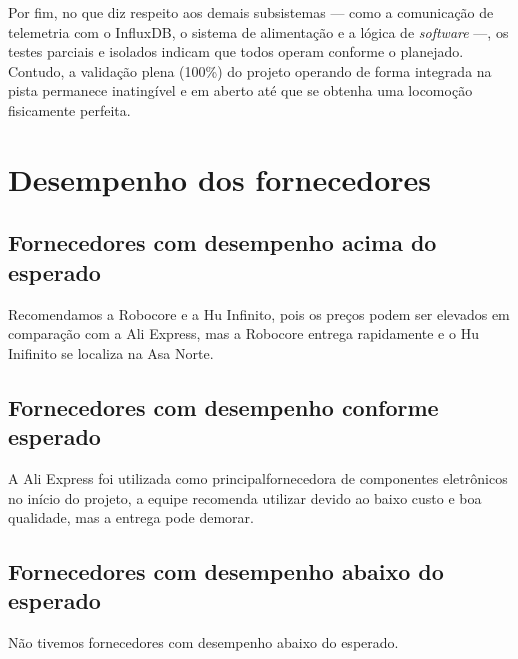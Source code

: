Por fim, no que diz respeito aos demais subsistemas --- como a comunicação de telemetria com o InfluxDB, o sistema de alimentação e a lógica de \textit{software} ---, os testes parciais e isolados indicam que todos operam conforme o planejado. Contudo, a validação plena (100\%) do projeto operando de forma integrada na pista permanece inatingível e em aberto até que se obtenha uma locomoção fisicamente perfeita.
\section{Desempenho dos fornecedores}

\subsection{Fornecedores com desempenho acima do esperado}

Recomendamos a Robocore e a Hu Infinito, pois os preços podem ser elevados em comparação com a Ali Express, mas a Robocore entrega rapidamente e o Hu Inifinito se localiza na Asa Norte.

\subsection{Fornecedores com desempenho conforme esperado}

A Ali Express foi utilizada como principalfornecedora de componentes eletrônicos no início do projeto, a equipe recomenda utilizar devido ao baixo custo e boa qualidade, mas a entrega pode demorar.

\subsection{Fornecedores com desempenho abaixo do esperado}

Não tivemos fornecedores com desempenho abaixo do esperado.